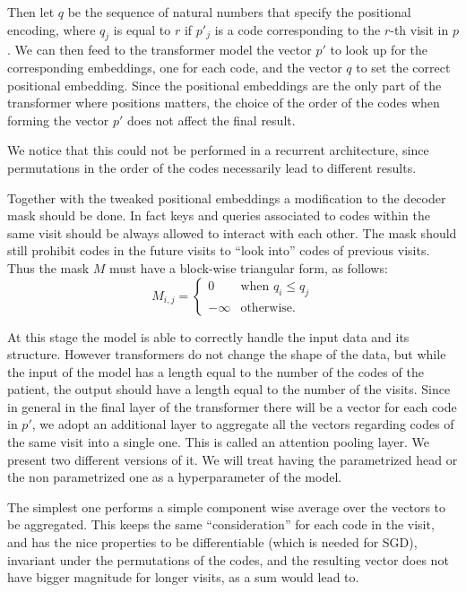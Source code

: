 \documentclass[]{marticle}
\begin{document}
Then let $q$ be the sequence of natural numbers that specify the positional encoding, where $q_j$ is
equal to $r$ if $p'_j$ is a code corresponding to the $r$-th visit in $p$. We can then feed to the
transformer model the vector $p'$ to look up for the corresponding embeddings, one for each code,
and the vector $q$ to set the correct positional embedding. Since the positional embeddings are the
only part of the transformer where positions matters, the choice of the order of the codes when
forming the vector $p'$ does not affect the final result.

We notice that this could not be performed in a recurrent architecture, since permutations in the
order of the codes necessarily lead to different results.

Together with the tweaked positional embeddings a modification to the decoder mask should be done.
In fact keys and queries associated to codes within the same visit should be always allowed to
interact with each other. The mask should still prohibit codes in the future visits to ``look
into'' codes of previous visits. Thus the mask $M$ must have a block-wise triangular form, as
follows:
\begin{equation*}
    M_{i,j} = \begin{cases}
        0       & \text{when $q_i\leq q_j$} \\
        -\infty & \text{otherwise.}
    \end{cases}
\end{equation*}

At this stage the model is able to correctly handle the input data and its structure. However
transformers do not change the shape of the data, but while the input of the model has a length
equal to the number of the codes of the patient, the output should have a length equal to the number
of the visits. Since in general in the final layer of the transformer there will be a vector for
each code in $p'$, we adopt an additional layer to aggregate all the vectors regarding codes of the
same visit into a single one. This is called an attention pooling layer. We present two different
versions of it. We will treat having the parametrized head or the non parametrized one as a
hyperparameter of the model.

The simplest one performs a simple component wise average over the vectors to be aggregated. This
keeps the same ``consideration'' for each code in the visit, and has the nice properties to be
differentiable (which is needed for SGD), invariant under the permutations of the codes, and
the resulting vector does not have bigger magnitude for longer visits, as a sum would lead to.
\end{document}
